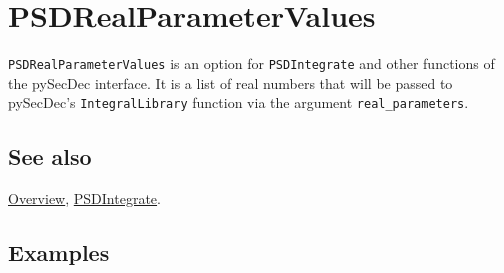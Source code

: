 \documentclass[../FeynHelpersManual.tex]{subfiles}
\begin{document}
\hypertarget{psdrealparametervalues}{
\section{PSDRealParameterValues}\label{psdrealparametervalues}}

\texttt{PSDRealParameterValues} is an option for \texttt{PSDIntegrate}
and other functions of the pySecDec interface. It is a list of real
numbers that will be passed to pySecDec's \texttt{IntegralLibrary}
function via the argument \texttt{real_parameters}.

\subsection{See also}

\hyperlink{toc}{Overview}, \hyperlink{psdintegrate}{PSDIntegrate}.

\subsection{Examples}
\end{document}
